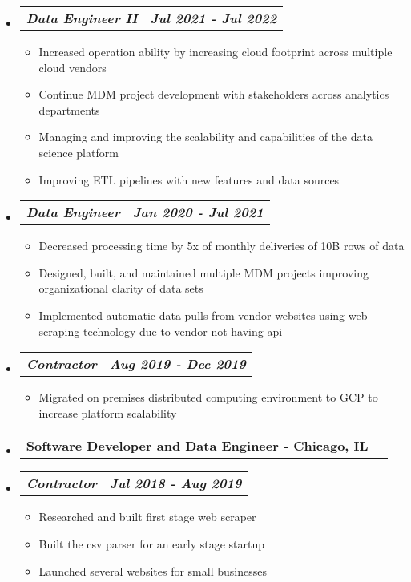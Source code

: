 \documentclass[letterpaper,11pt]{article}
\makeatletter
\newcommand{\resumeItem}[1]{
  \item\small{
    {#1 \vspace{0pt}}
  }
}
\newcommand{\resumeSubheading}[2]{
  \vspace{-1pt}\item
    \begin{tabular*}{0.97\textwidth}[t]{l@{\extracolsep{\fill}}r}
      \textbf{\small#1 - \small#2} 
    \end{tabular*}\vspace{-13pt}
}
\newcommand{\resumeSubSubheading}[2]{
    \item
    \vspace{2pt}
    \begin{tabular*}{0.97\textwidth}{l@{\extracolsep{\fill}}r}
      \textbf{\textit{\small#1}} & \textbf{\textit{\small#2}} \\
    \end{tabular*}\vspace{-5pt}
}
\newcommand{\resumeHeadingListStart}{\begin{itemize}[leftmargin=0.05in, label={}]}
\newcommand{\resumeHeadingListEnd}{\end{itemize}}
\newcommand{\resumeSubHeadingListStart}{\begin{itemize}[leftmargin=0.15in, label={}]}
\newcommand{\resumeSubHeadingListEnd}{\end{itemize}\vspace{-15pt}}
\newcommand{\resumeItemListStart}{\begin{itemize}[leftmargin=0.15in]}
\newcommand{\resumeItemListEnd}{\end{itemize}\vspace{-10pt}}
\makeatother
\begin{document}
        \resumeSubHeadingListStart
            \resumeSubSubheading {Data Engineer II}{Jul 2021 - Jul 2022}
            \resumeItemListStart
                \resumeItem{Increased operation ability by increasing cloud footprint across multiple cloud vendors}
                \resumeItem{Continue MDM project development with stakeholders across analytics departments}
                \resumeItem{Managing and improving the scalability and capabilities of the data science platform }
                \resumeItem{Improving ETL pipelines with new features and data sources}
            \resumeItemListEnd
        \resumeSubHeadingListEnd
        \resumeSubHeadingListStart
            \resumeSubSubheading {Data Engineer}{Jan 2020 - Jul 2021}
            \resumeItemListStart
                \resumeItem{Decreased processing time by 5x of monthly deliveries of 10B rows of data}
                \resumeItem{Designed, built, and maintained multiple MDM projects improving organizational clarity of data sets}
                \resumeItem{Implemented automatic data pulls from vendor websites using web scraping technology due to vendor not having api}
            \resumeItemListEnd
        \resumeSubHeadingListEnd
        \resumeSubHeadingListStart
            \resumeSubSubheading {Contractor}{Aug 2019 - Dec 2019}
            \resumeItemListStart
                \resumeItem{    Migrated on premises distributed computing environment to GCP to increase platform scalability}
            \resumeItemListEnd
        \resumeSubHeadingListEnd
    \resumeHeadingListStart
        \resumeSubheading{Software Developer and Data Engineer}{Chicago, IL}
    \resumeHeadingListEnd
        \resumeSubHeadingListStart
            \resumeSubSubheading {Contractor}{Jul 2018 - Aug 2019}
            \resumeItemListStart
                \resumeItem{Researched and built first stage web scraper}
                \resumeItem{Built the csv parser for an early stage startup}
                \resumeItem{Launched several websites for small businesses}
            \resumeItemListEnd
        \resumeSubHeadingListEnd
\end{document}
